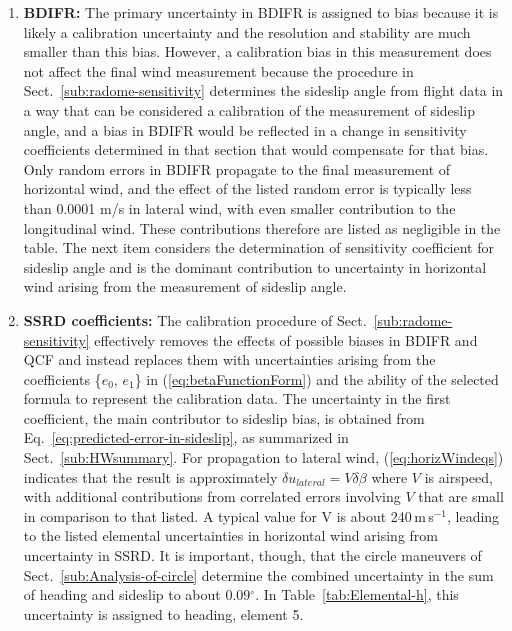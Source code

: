 \documentclass[12pt,twoside,english]{article}\usepackage[]{graphicx}\usepackage[]{color}
\begin{document}
{{\begin{enumerate}
\item \textbf{BDIFR:} 
The primary uncertainty in BDIFR is assigned to bias because it is likely a calibration uncertainty and the resolution and stability are much smaller than this bias. However, a calibration bias in this measurement does not affect the final wind measurement because the procedure in Sect.~\ref{sub:radome-sensitivity} determines the sideslip angle from flight data in a way that can be considered a calibration of the measurement of sideslip angle, and a bias in BDIFR would be reflected in a change in sensitivity coefficients determined in that section that would compensate for that bias. Only random errors in BDIFR propagate to the final measurement of horizontal wind, and the effect of the listed random error is typically less than 0.0001 m/s in lateral wind, with even smaller contribution to the longitudinal wind. These contributions therefore are listed as negligible in the table. The next item considers the determination of sensitivity coefficient for sideslip angle and is the dominant contribution to uncertainty in horizontal wind arising from the measurement of sideslip angle.  
\item \textbf{SSRD coefficients:} 
The calibration procedure of Sect.~\ref{sub:radome-sensitivity} effectively removes the effects of possible biases in BDIFR and QCF and instead replaces them with uncertainties arising from the coefficients \{$e_{0},\,e_{1}$\} in (\ref{eq:betaFunctionForm}) and the ability of the selected formula to represent the calibration data. The uncertainty in the first coefficient, the main contributor to sideslip bias, is obtained from Eq.~\eqref{eq:predicted-error-in-sideslip}, as summarized in Sect.~\ref{sub:HWsummary}.  For propagation to lateral wind, (\ref{eq:horizWindeqs}) indicates that the result is approximately $\delta u_{lateral}=V\delta\beta$ where $V$ is airspeed, with additional contributions from correlated errors involving $V$ that are small in comparison to that listed. A typical value for V is about 240\,m\,s$^{-1}$, leading to the listed elemental uncertainties in horizontal wind arising from uncertainty in SSRD. It is important, though, that the circle maneuvers of Sect.~\ref{sub:Analysis-of-circle} determine the combined uncertainty in the sum of heading and sideslip to about 0.09$^{\circ}$. In Table~\ref{tab:Elemental-h}, this uncertainty is assigned to heading, element 5.  

\end{enumerate}}}
\end{document}
